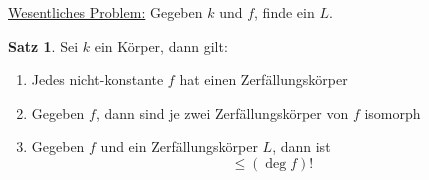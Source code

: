 \documentclass[12pt,parskip=full]{scrartcl}
\newcommand{\heading}{\underline}
\theoremstyle{definition}
\newtheorem{theorem}{Satz}[section]
\theoremstyle{remark}
\begin{document}
	\heading{Wesentliches Problem:} Gegeben $k$ und $f$, finde ein $L$.
	
	\begin{theorem}
		Sei $k$ ein Körper, dann gilt:
		\begin{enumerate}
			\item Jedes nicht-konstante $f$ hat einen Zerfällungskörper
			\item Gegeben $f$, dann sind je zwei Zerfällungskörper von $f$ isomorph
			\item Gegeben $f$ und ein Zerfällungskörper $L$, dann ist
			\begin{equation*}
				[L:k] \leq (\deg f)!
			\end{equation*}
		\end{enumerate}
	\end{theorem}
\end{document}
